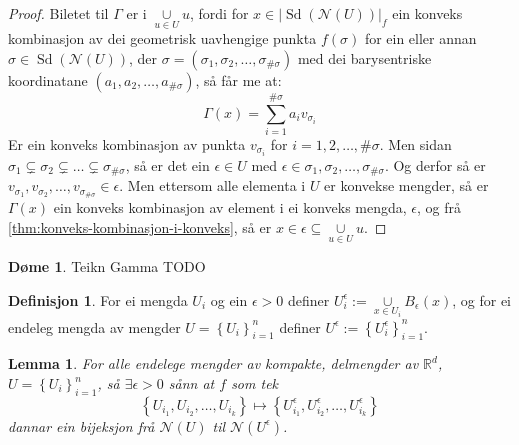 \documentclass[a4paper, titlepage, 12pt, norsk]{article}
\theoremstyle{plain}
\newtheorem{lemma}[theorem]{Lemma}
\theoremstyle{definition}
\newtheorem{definition}[theorem]{Definisjon}
\newtheorem{example}[theorem]{Døme}
\newcommand{\Rb}{\mathbb{R}}
\newcommand{\Nc}{\mathcal{N}}
\newcommand{\union}{ \mathop{\cup}\limits }
\newcommand{\gr}[1]{ \lvert #1 \rvert } %
\newcommand{\set}[1]{ \left \{ #1 \right \} } %
\newcommand{\tuple}[1]{ \left( #1 \right) } %
\DeclareMathOperator{\Sd}{Sd}
\begin{document}
\begin{proof}
	Biletet til \( \Gamma \) er i \( \union_{u\in U} u \), fordi for \( x \in \gr{\Sd(\Nc(U))}_f \) ein konveks kombinasjon av dei geometrisk uavhengige punkta \( f(\sigma) \) for ein eller annan \( \sigma \in \Sd(\Nc(U)) \), der \( \sigma = \tuple{\sigma_1, \sigma_2, \dots, \sigma_{\#\sigma}} \) med dei barysentriske koordinatane \( \tuple{a_1, a_2, \dots, a_{\#\sigma}} \), så får me at:
	\[
		\Gamma(x) = \sum_{i=1}^{\#\sigma} a_i v_{\sigma_i}
	\]
	Er ein konveks kombinasjon av punkta \( v_{\sigma_i} \) for \( i = 1,2,\dots,\#\sigma \). Men sidan \( \sigma_1 \subsetneq \sigma_2 \subsetneq \dots \subsetneq \sigma_{\#\sigma} \), så er det ein \( \epsilon \in U \) med \( \epsilon \in \sigma_1, \sigma_2, \dots, \sigma_{\#\sigma} \). Og derfor så er \( v_{\sigma_1}, v_{\sigma_2}, \dots, v_{\sigma_{\#\sigma}} \in \epsilon \). Men ettersom alle elementa i \( U \) er konvekse mengder, så er \( \Gamma(x) \) ein konveks kombinasjon av element i ei konveks mengda, \( \epsilon \), og frå \autoref{thm:konveks-kombinasjon-i-konveks}, så er \( x \in \epsilon \subseteq \union_{u\in U} u \).
\end{proof}

\begin{example}
	Teikn Gamma TODO
\end{example}

\begin{definition} %
	For ei mengda \( U_i \) og ein \( \epsilon > 0 \) definer \( U_i^\epsilon := \union_{x \in U_i} B_\epsilon(x) \), og for ei endeleg mengda av mengder \( U=\set{U_i}_{i=1}^n \) definer \( U^\epsilon := \set{U_i^\epsilon}_{i=1}^n \).
\end{definition}

\begin{lemma} \label{thm:epsilondekke} %
	For alle endelege mengder av kompakte, delmengder av \( \Rb^d \), \( U = \set{U_i}_{i=1}^n \), så \( \exists \epsilon > 0 \) sånn at \(f \) som tek 
	\[ 
		\set{U_{i_1}, U_{i_2}, \dots, U_{i_k}} \mapsto \set{U_{i_1}^\epsilon, U_{i_2}^\epsilon, \dots, U_{i_k}^\epsilon} 
	\] 
	dannar ein bijeksjon frå  \(\Nc(U) \) til \( \Nc(U^\epsilon) \).
\end{lemma}
\end{document}
